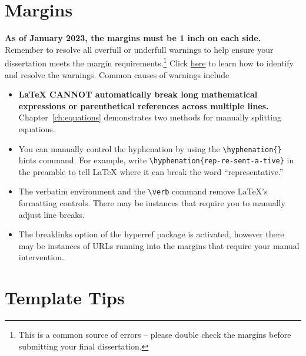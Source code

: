\documentclass[11pt]{report}
\begin{document}
\begin{mainf}
\section{Margins}
\textbf{As of January 2023, the margins must be 1 inch on each side.} Remember to resolve all overfull or underfull warnings to help ensure your dissertation meets the margin requirements.\footnote{This is a common source of errors -- please double check the margins before submitting your final dissertation.} Click \underline{\href{https://www.overleaf.com/learn/how-to/Understanding_underfull_and_overfull_box_warnings\#How_the_Error_Happens}{here}} to learn how to identify and resolve the warnings. Common causes of warnings include 
\begin{itemize}
\item \textbf{LaTeX CANNOT automatically break long mathematical expressions or parenthetical references across multiple lines.} Chapter~\ref{ch:equations} demonstrates two methods for manually splitting equations.
\item You can manually control the hyphenation by using the \verb|\hyphenation{}| hints command. For example, write \verb|\hyphenation{rep-re-sent-a-tive}| in the preamble to tell LaTeX where it can break the word ``representative.''
\item The verbatim environment and the \verb|\verb| command remove LaTeX's formatting controls. There may be instances that require you to manually adjust line breaks.
\item The breaklinks option of the hyperref package is activated, however there may be instances of URLs running into the margins that require your manual intervention.
\end{itemize}

\section{Template Tips}

\end{mainf}
\end{document}
